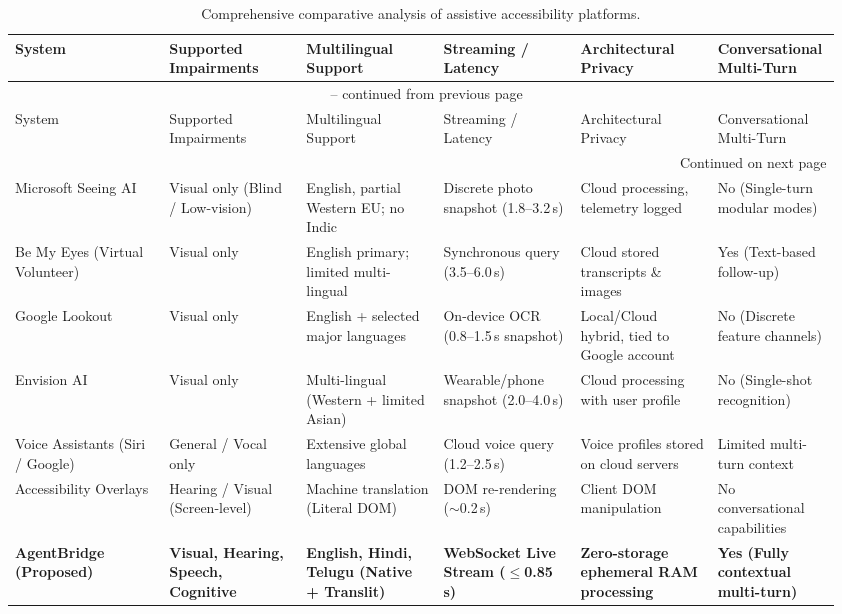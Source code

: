 \documentclass[10pt,a4paper]{article}
\begin{document}
\small
\begin{longtable}{@{}p{0.18\linewidth}p{0.16\linewidth}p{0.16\linewidth}p{0.16\linewidth}p{0.16\linewidth}p{0.14\linewidth}@{}}
\caption{Comprehensive comparative analysis of assistive accessibility platforms.}
\label{tab:literature_comparison}\\
\toprule
System & Supported Impairments & Multilingual Support & Streaming / Latency & Architectural Privacy & Conversational Multi-Turn \\
\midrule
\endfirsthead

\multicolumn{6}{c}{\tablename\ \thetable{} -- continued from previous page}\\
\toprule
System & Supported Impairments & Multilingual Support & Streaming / Latency & Architectural Privacy & Conversational Multi-Turn \\
\midrule
\endhead

\midrule
\multicolumn{6}{r}{Continued on next page}\\
\endfoot

\bottomrule
\endlastfoot

Microsoft Seeing AI & Visual only (Blind / Low-vision) & English, partial Western EU; no Indic & Discrete photo snapshot (1.8--3.2\,s) & Cloud processing, telemetry logged & No (Single-turn modular modes) \\
\addlinespace

Be My Eyes (Virtual Volunteer) & Visual only & English primary; limited multi-lingual & Synchronous query (3.5--6.0\,s) & Cloud stored transcripts \& images & Yes (Text-based follow-up) \\
\addlinespace

Google Lookout & Visual only & English + selected major languages & On-device OCR (0.8--1.5\,s snapshot) & Local/Cloud hybrid, tied to Google account & No (Discrete feature channels) \\
\addlinespace

Envision AI & Visual only & Multi-lingual (Western + limited Asian) & Wearable/phone snapshot (2.0--4.0\,s) & Cloud processing with user profile & No (Single-shot recognition) \\
\addlinespace

Voice Assistants (Siri / Google) & General / Vocal only & Extensive global languages & Cloud voice query (1.2--2.5\,s) & Voice profiles stored on cloud servers & Limited multi-turn context \\
\addlinespace

Accessibility Overlays & Hearing / Visual (Screen-level) & Machine translation (Literal DOM) & DOM re-rendering ($\sim$0.2\,s) & Client DOM manipulation & No conversational capabilities \\
\addlinespace

\textbf{AgentBridge (Proposed)} & \textbf{Visual, Hearing, Speech, Cognitive} & \textbf{English, Hindi, Telugu (Native + Translit)} & \textbf{WebSocket Live Stream ($\le$0.85\,s)} & \textbf{Zero-storage ephemeral RAM processing} & \textbf{Yes (Fully contextual multi-turn)} \\

\end{longtable}
\normalsize
\end{document}
